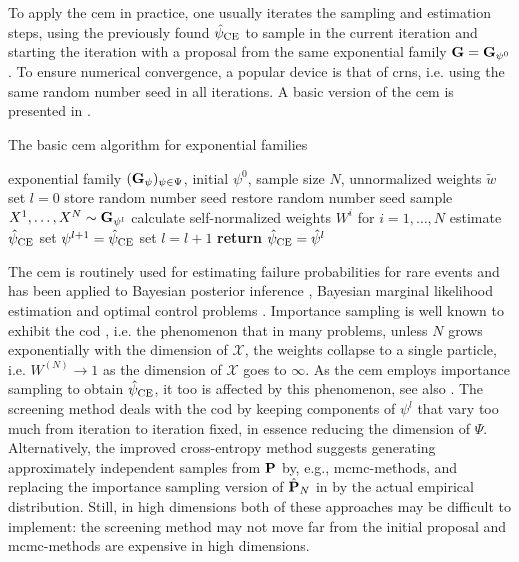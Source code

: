 To apply the \acrshort{cem} in practice, one usually iterates the sampling and estimation steps, using the previously found $\hpce$ to sample in the current iteration and starting the iteration with a proposal from the same exponential family $\G = \G_{\psi^{0}}$. To ensure numerical convergence, a popular device is that of \glspl{crn}, i.e. using the same random number seed in all iterations. A basic version of the \acrshort{cem} is presented in .

\begin{algorithm}
    \caption{The basic \gls{cem} algorithm for exponential families}
    \label{alg:cem-basic}
    \begin{algorithmic}
        \Require exponential family $(\G_{\psi})_{\psi \in\Psi}$, initial $\psi^{0}$, sample size $N$, unnormalized weights $\tilde w$
        \State set $l = 0$
        \State store random number seed
        \Repeat
            \State restore random number seed
            \State sample $X^{1}, \dots, X^{N} \sim \G_{\psi^{l}}$
            \State calculate self-normalized weights $W^{i}$ for $i = 1, \dots, N$ 
            \State estimate $\hpce$ 
            \State set $\psi^{l + 1} = \hpce$
            \State set $l = l + 1$
        \State \textbf{return} $\hpce = \hat\psi^{l}$
    \end{algorithmic}
\end{algorithm}

The \gls{cem} is routinely used for estimating failure probabilities for rare events \citep{Homem-de-Mello2007Study} and has been applied to Bayesian posterior inference \citep{Engel2023Bayesian,Ehre2023Certified}, Bayesian marginal likelihood estimation \citep{Chan2012Marginal} and optimal control problems \citep{Kappen2016Adaptive,Zhang2014Applications}.
Importance sampling is well known to exhibit the \gls{cod} \cite{Bengtsson2008Curseofdimensionality}, i.e. the phenomenon that in many problems, unless $N$ grows exponentially with the dimension of $\mathcal X$, the weights collapse to a single particle, i.e. $W^{(N)} \to 1$ as the dimension of $\mathcal X$ goes to $\infty$. As the \acrshort{cem} employs importance sampling to obtain $\hpce$, it too is affected by this phenomenon, see also . 
The screening method \cite{Rubinstein2009How} deals with the \acrshort{cod} by keeping components of $\psi^{l}$ that vary too much from iteration to iteration fixed, in essence reducing the dimension of $\Psi$. 
Alternatively, the improved cross-entropy method \citep{Chan2012Improved} suggests generating approximately independent samples from $\P$ by, e.g., \acrshort{mcmc}-methods, and replacing the importance sampling version of $\hat\P_{N}$  in  by the actual empirical distribution.
Still, in high dimensions both of these approaches may be difficult to implement: the screening method may not move far from the initial proposal and \acrshort{mcmc}-methods are expensive in high dimensions.


